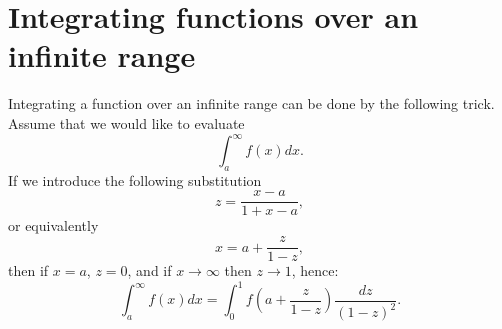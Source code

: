 \documentclass[graybox,sectrefs,envcountresetchap,open=right,final]{svmonodo}
\begin{document}
\section{Integrating functions over an infinite range}
Integrating a function over an infinite range can be done by the following trick. Assume that we would like to evaluate
\begin{equation}
\int_a^\infty f(x) dx.
\label{eq:numint:inf}
\end{equation}
If we introduce the following substitution
\begin{equation}
z=\frac{x-a}{1+x-a},
\label{eq:numint:infs}
\end{equation}
or equivalently
\begin{equation}
x=a+\frac{z}{1-z},
\label{eq:numint:infs2}
\end{equation}
then if $x=a$, $z=0$, and if $x\to\infty$ then $z\to1$, hence:
\begin{equation}
\int_a^\infty f(x) dx = \int_0^1 f(a+\frac{z}{1-z}) \frac{dz}{(1-z)^2}.
\label{eq:numint:infs3}
\end{equation}
\end{document}
